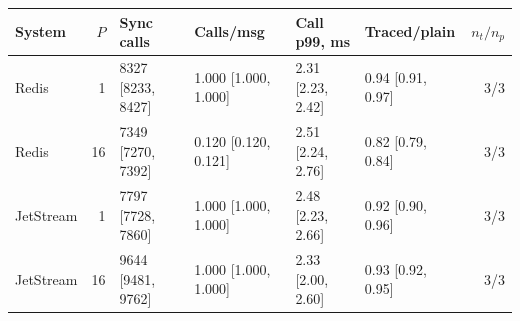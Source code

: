 \begin{tabular}{lrllllr}
\toprule
System & $P$ & Sync calls & Calls/msg & Call p99, ms & Traced/plain & $n_t/n_p$\\
\midrule
Redis & 1 & 8327 [8233, 8427] & 1.000 [1.000, 1.000] & 2.31 [2.23, 2.42] & 0.94 [0.91, 0.97] & 3/3\\
Redis & 16 & 7349 [7270, 7392] & 0.120 [0.120, 0.121] & 2.51 [2.24, 2.76] & 0.82 [0.79, 0.84] & 3/3\\
JetStream & 1 & 7797 [7728, 7860] & 1.000 [1.000, 1.000] & 2.48 [2.23, 2.66] & 0.92 [0.90, 0.96] & 3/3\\
JetStream & 16 & 9644 [9481, 9762] & 1.000 [1.000, 1.000] & 2.33 [2.00, 2.60] & 0.93 [0.92, 0.95] & 3/3\\
\bottomrule
\end{tabular}
